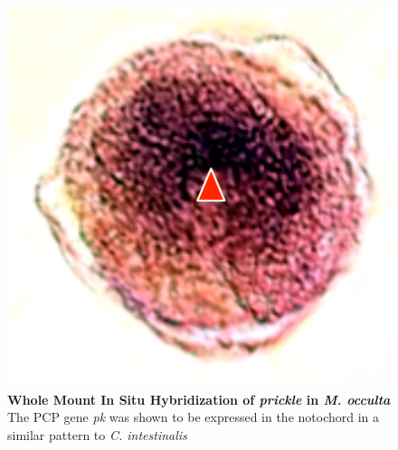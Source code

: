 \begin{figure}[tbp]
\centering
\includegraphics[scale=0.55]{figures/prickle.pdf}
\caption{\textbf{Whole Mount In Situ Hybridization of \textit{prickle} in \textit{M. occulta}} The PCP gene \textit{pk} was shown to be expressed in the notochord in a similar pattern to \textit{C. intestinalis} }
\label{fig:prickle}
\end{figure}
